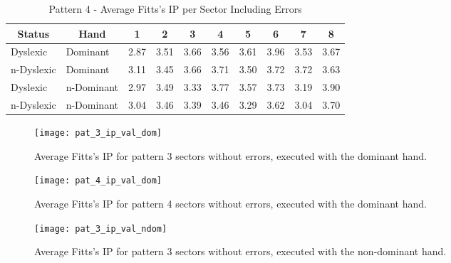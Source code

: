 	\begin{table}[h]
		\centering
		\caption{Pattern 4 - Average Fitts's IP per Sector Including Errors}
		\label{tab_pat_4_ip_all}
		\begin{tabularx}{\textwidth}{|l|l|X|X|X|X|X|X|X|X|}
			\hline
			\multicolumn{1}{|c|}{\textbf{Status}} & \multicolumn{1}{c|}{\textbf{Hand}} & \multicolumn{1}{c|}{\textbf{1}} & \multicolumn{1}{c|}{\textbf{2}} & \multicolumn{1}{c|}{\textbf{3}} & \multicolumn{1}{c|}{\textbf{4}} & \multicolumn{1}{c|}{\textbf{5}} & \multicolumn{1}{c|}{\textbf{6}} & \multicolumn{1}{c|}{\textbf{7}} & \multicolumn{1}{c|}{\textbf{8}} \\ \hline
			Dyslexic                              & Dominant                           & 2.87       & 3.51       & 3.66       & 3.56       & 3.61       & 3.96       & 3.53       & 3.67       \\ \hline
			n-Dyslexic                          & Dominant                           & 3.11       & 3.45       & 3.66       & 3.71       & 3.50       & 3.72       & 3.72       & 3.63       \\ \hline
			Dyslexic                              & n-Dominant                       & 2.97       & 3.49       & 3.33       & 3.77       & 3.57       & 3.73       & 3.19       & 3.90       \\ \hline
			n-Dyslexic                          & n-Dominant                       & 3.04       & 3.46       & 3.39       & 3.46       & 3.29       & 3.62       & 3.04       & 3.70       \\ \hline
		\end{tabularx}
	\end{table}

	\begin{figure}[h]
		\centering
		\texttt{[image: pat\_3\_ip\_val\_dom]}
		\caption{Average Fitts's IP for pattern 3 sectors without errors, executed with the dominant hand.}
		\label{fi_pat_3_ip_dom}
	\end{figure}		

	\begin{figure}[]
		\centering
		\texttt{[image: pat\_4\_ip\_val\_dom]}
		\caption{Average Fitts's IP for pattern 4 sectors without errors, executed with the dominant hand.}
		\label{fi_pat_4_ip_dom}
	\end{figure}

	\begin{figure}[]
		\centering
		\texttt{[image: pat\_3\_ip\_val\_ndom]}
		\caption{Average Fitts's IP for pattern 3 sectors without errors, executed with the non-dominant hand.}
		\label{fi_pat_3_ip_ndom}
	\end{figure}		
	
